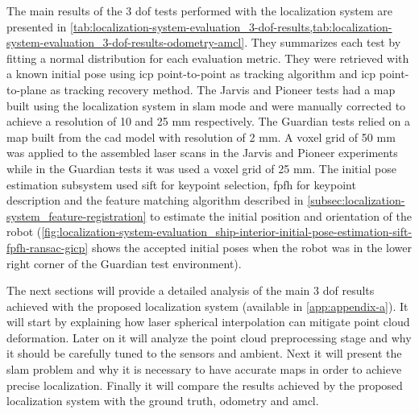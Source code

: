The main results of the 3 \gls{dof} tests performed with the localization system are presented in \cref{tab:localization-system-evaluation_3-dof-results,tab:localization-system-evaluation_3-dof-results-odometry-amcl}. They summarizes each test by fitting a normal distribution for each evaluation metric. They were retrieved with a known initial pose using \gls{icp} point-to-point as tracking algorithm and \gls{icp} point-to-plane as tracking recovery method. The Jarvis and Pioneer tests had a map built using the localization system in \gls{slam} mode and were manually corrected to achieve a resolution of 10 and 25 mm respectively. The Guardian tests relied on a map built from the \gls{cad} model with resolution of 2 mm. A voxel grid of 50 mm was applied to the assembled laser scans in the Jarvis and Pioneer experiments while in the Guardian tests it was used a voxel grid of 25 mm. The initial pose estimation subsystem used \gls{sift} for keypoint selection, \gls{fpfh} for keypoint description and the feature matching algorithm described in \cref{subsec:localization-system_feature-registration} to estimate the initial position and orientation of the robot (\cref{fig:localization-system-evaluation_ship-interior-initial-pose-estimation-sift-fpfh-ransac-gicp} shows the accepted initial poses when the robot was in the lower right corner of the Guardian test environment).

The next sections will provide a detailed analysis of the main 3 \gls{dof} results achieved with the proposed localization system (available in \cref{app:appendix-a}). It will start by explaining how laser spherical interpolation can mitigate point cloud deformation. Later on it will analyze the point cloud preprocessing stage and why it should be carefully tuned to the sensors and ambient. Next it will present the \gls{slam} problem and why it is necessary to have accurate maps in order to achieve precise localization. Finally it will compare the results achieved by the proposed localization system with the ground truth, odometry and \gls{amcl}.

\clearpage

